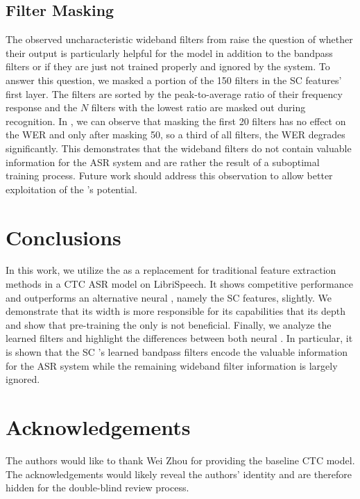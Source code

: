 \documentclass{INTERSPEECH2023}
\begin{document}
\subsection{Filter Masking}

The observed uncharacteristic wideband filters from  raise the question of whether their output is particularly helpful for the model in addition to the bandpass filters or if they are just not trained properly and ignored by the system.
To answer this question, we masked a portion of the 150 filters in the \gls{SC} features' first layer.
The filters are sorted by the peak-to-average ratio of their frequency response and the $N$ filters with the lowest ratio are masked out during recognition.
In , we can observe that masking the first 20 filters has no effect on the \gls{WER} and only after masking 50, so a third of all filters, the \gls{WER} degrades significantly.
This demonstrates that the wideband filters do not contain valuable information for the \gls{ASR} system and are rather the result of a suboptimal training process.
Future work should address this observation to allow better exploitation of the \fe's potential.

\section{Conclusions}
In this work, we utilize the \wvtwo \fe as a replacement for traditional feature extraction methods in a \gls{CTC} \gls{ASR} model on LibriSpeech.
It shows competitive performance and outperforms an alternative neural \fe, namely the \gls{SC} features, slightly.
We demonstrate that its width is more responsible for its capabilities that its depth and show that pre-training the \fe only is not beneficial.
Finally, we analyze the learned filters and highlight the differences between both neural \fes.
In particular, it is shown that the \gls{SC} \fe's learned bandpass filters encode the valuable information for the \gls{ASR} system while the remaining wideband filter information is largely ignored.

\section{Acknowledgements}
\ifinterspeechfinal
     The authors would like to thank Wei Zhou for providing the baseline \gls{CTC} model.
\else
     The acknowledgements would likely reveal the authors' identity and are therefore hidden for the double-blind review process.
\fi



\end{document}
